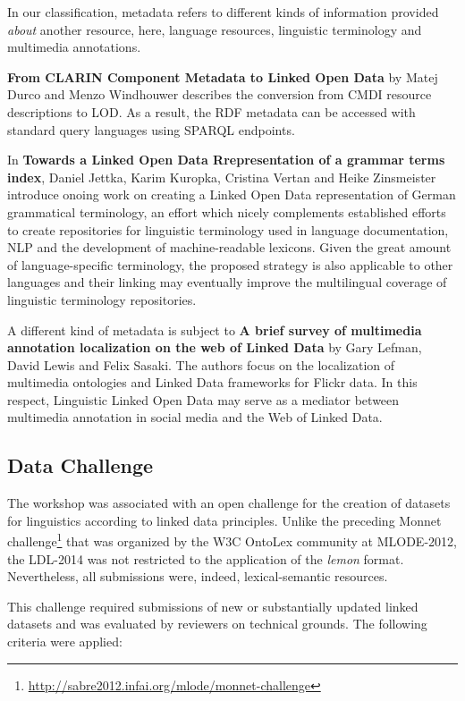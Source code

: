 	In our classification, metadata refers to different kinds of information provided \emph{about} another resource, here, language resources, linguistic terminology and multimedia annotations.
	
	\textbf{From CLARIN Component Metadata to Linked Open Data} by 
	Matej Durco and Menzo Windhouwer describes the conversion from CMDI resource descriptions to LOD. 
	As a result, the RDF metadata can be accessed with standard query languages using SPARQL endpoints. 

	In \textbf{Towards a Linked Open Data Rrepresentation of a grammar terms index},
	Daniel Jettka, Karim Kuropka, Cristina Vertan and Heike Zinsmeister introduce onoing work on creating a Linked Open Data 
	representation of German grammatical terminology, an effort which nicely complements established efforts to create repositories for linguistic terminology used in language documentation, NLP and the development of machine-readable lexicons. Given the great amount of language-specific terminology, the proposed strategy is also applicable to other languages and their linking may eventually improve the multilingual coverage of linguistic terminology repositories.

	A different kind of metadata is subject to \textbf{A brief survey of multimedia annotation localization on the web of Linked Data} by 
	Gary Lefman, David Lewis and Felix Sasaki. The authors focus on the localization of multimedia ontologies and Linked Data frameworks for Flickr data. 
	In this respect, Linguistic Linked Open Data may serve as a mediator between multimedia annotation in social media and the Web of Linked Data. 

\subsection{Data Challenge}

The workshop was associated with an open challenge for the creation of datasets for linguistics according to linked data principles.
Unlike the preceding Monnet challenge\footnote{
	\url{http://sabre2012.infai.org/mlode/monnet-challenge}
} 
that was organized by the W3C OntoLex community at MLODE-2012, the LDL-2014 was not restricted to the application of the \emph{lemon} format. 
Nevertheless, all submissions were, indeed, lexical-semantic resources.
 
This challenge required submissions of new or substantially updated linked datasets and was evaluated by reviewers on technical grounds. 
The following criteria were applied: 

